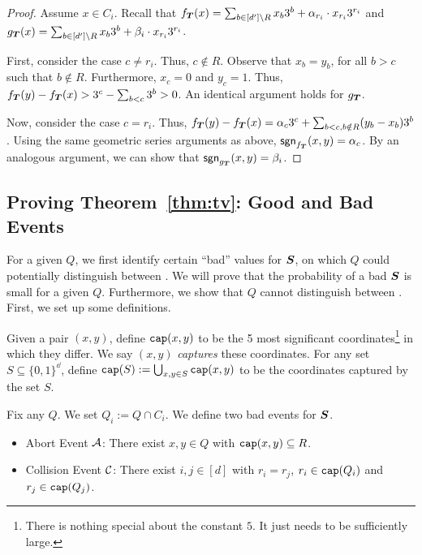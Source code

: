 \begin{proof}
Assume $x \in C_i$.
	Recall that $f_{\boldsymbol{T}}(x) = \sum_{b \in [d'] \setminus R} x_b 3^b + \alpha_{r_i}\cdot x_{r_i} 3^{r_i}$ and
	$g_{\boldsymbol{T}}(x) = \sum_{b \in [d'] \setminus R} x_b 3^b + \beta_i \cdot x_{r_i} 3^{r_i}$.
	
	First, consider the case $c \neq r_i$. Thus, $c \notin R$.
	Observe that $x_b = y_b$, for all $b > c$ such that $b \notin R$.
	Furthermore, $x_c = 0$ and $y_c = 1$. Thus,
	$f_{\boldsymbol{T}}(y) - f_{\boldsymbol{T}}(x) > 3^c - \sum_{b < c} 3^b > 0$.
	An identical argument holds for $g_{\boldsymbol{T}}$.
	
	Now, consider the case $c = r_i$. Thus,
	$f_{\boldsymbol{T}}(y) - f_{\boldsymbol{T}}(x) = \alpha_c 3^c + \sum_{b < c, b \notin R}
	(y_b - x_b) 3^b$. Using the same geometric series arguments
	as above, $\mathsf{sgn}_{f_{\boldsymbol{T}}}(x,y) = \alpha_c$.
	By an analogous argument, we can show that $\mathsf{sgn}_{g_{\boldsymbol{T}}}(x,y) = \beta_i$.
\end{proof}

\subsection{Proving Theorem~\ref{thm:tv}: Good and Bad Events} \label{sec:thm-tv-proof}
For a given  $Q$, we first identify certain ``bad'' values for $\boldsymbol{S}$,
on which $Q$ could potentially distinguish between .
We will
prove that the probability
of a bad $\boldsymbol{S}$ is small for a given $Q$.
Furthermore, we show that $Q$ cannot distinguish
between .
First, we set up some definitions.

\begin{definition} \label{def:cap}
	Given a pair $(x,y)$, define $\mathtt{cap}(x,y)$ to be the 5 most significant coordinates\footnote{There is nothing special about the constant $5$. It just needs to be sufficiently large.}
	in which they differ.
We say $(x,y)$ {\em captures} these coordinates.
For any set  $S\subseteq \{0,1\}^{\dd}$, define $\mathtt{cap}(S) := \bigcup_{x,y \in S} \mathtt{cap}(x,y)$
to be the coordinates captured by the set $S$.
\end{definition}

\noindent Fix any $Q$. We set $Q_i := Q \cap C_i$.
We define two bad events for $\boldsymbol{S}$.
\begin{itemize}
	\item Abort Event ${\cal A}$: There exist $x,y \in Q$ with
    $\mathtt{cap}(x,y) \subseteq R$.
	\item Collision Event ${\cal C}$: There exist $i,j \in [d]$
     with $r_i = r_j$,  $r_i\in \mathtt{cap}(Q_i)$ and $r_j\in \mathtt{cap}(Q_j)$.
\end{itemize}

